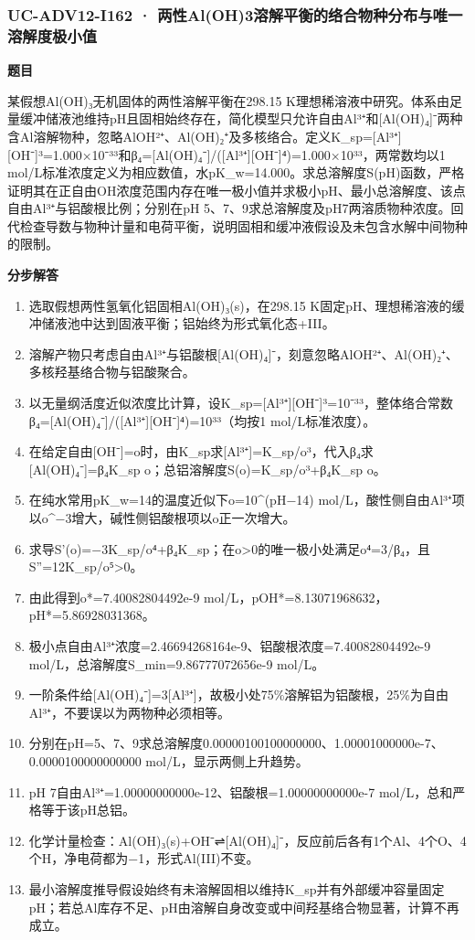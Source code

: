 \documentclass[UTF8,11pt,a4paper]{ctexart}
\begin{document}
\subsubsection*{UC-ADV12-I162 · 两性Al(OH)3溶解平衡的络合物种分布与唯一溶解度极小值}
\noindent\textbf{题目}\par
某假想Al(OH)₃无机固体的两性溶解平衡在298.15 K理想稀溶液中研究。体系由足量缓冲储液池维持pH且固相始终存在，简化模型只允许自由Al³⁺和[Al(OH)₄]⁻两种含Al溶解物种，忽略AlOH²⁺、Al(OH)₂⁺及多核络合。定义K\_sp=[Al³⁺][OH⁻]³=1.000×10⁻³³和β₄=[Al(OH)₄⁻]/([Al³⁺][OH⁻]⁴)=1.000×10³³，两常数均以1 mol/L标准浓度定义为相应数值，水pK\_w=14.000。求总溶解度S(pH)函数，严格证明其在正自由OH浓度范围内存在唯一极小值并求极小pH、最小总溶解度、该点自由Al³⁺与铝酸根比例；分别在pH 5、7、9求总溶解度及pH7两溶质物种浓度。回代检查导数与物种计量和电荷平衡，说明固相和缓冲液假设及未包含水解中间物种的限制。\par
\medskip\noindent\textbf{分步解答}
\begin{enumerate}
\item 选取假想两性氢氧化铝固相Al(OH)₃(s)，在298.15 K固定pH、理想稀溶液的缓冲储液池中达到固液平衡；铝始终为形式氧化态+III。
\item 溶解产物只考虑自由Al³⁺与铝酸根[Al(OH)₄]⁻，刻意忽略AlOH²⁺、Al(OH)₂⁺、多核羟基络合物与铝酸聚合。
\item 以无量纲活度近似浓度比计算，设K\_sp=[Al³⁺][OH⁻]³=10⁻³³，整体络合常数β₄=[Al(OH)₄⁻]/([Al³⁺][OH⁻]⁴)=10³³（均按1 mol/L标准浓度）。
\item 在给定自由[OH⁻]=o时，由K\_sp求[Al³⁺]=K\_sp/o³，代入β₄求[Al(OH)₄⁻]=β₄K\_sp o；总铝溶解度S(o)=K\_sp/o³+β₄K\_sp o。
\item 在纯水常用pK\_w=14的温度近似下o=10\textasciicircum{}(pH−14) mol/L，酸性侧自由Al³⁺项以o\textasciicircum{}−3增大，碱性侧铝酸根项以o正一次增大。
\item 求导S'(o)=−3K\_sp/o⁴+β₄K\_sp；在o>0的唯一极小处满足o⁴=3/β₄，且S''=12K\_sp/o⁵>0。
\item 由此得到o*=7.40082804492e-9 mol/L，pOH*=8.13071968632，pH*=5.86928031368。
\item 极小点自由Al³⁺浓度=2.46694268164e-9、铝酸根浓度=7.40082804492e-9 mol/L，总溶解度S\_min=9.86777072656e-9 mol/L。
\item 一阶条件给[Al(OH)₄⁻]=3[Al³⁺]，故极小处75\%溶解铝为铝酸根，25\%为自由Al³⁺，不要误以为两物种必须相等。
\item 分别在pH=5、7、9求总溶解度0.00000100100000000、1.00001000000e-7、0.0000100000000000 mol/L，显示两侧上升趋势。
\item pH 7自由Al³⁺=1.00000000000e-12、铝酸根=1.00000000000e-7 mol/L，总和严格等于该pH总铝。
\item 化学计量检查：Al(OH)₃(s)+OH⁻⇌[Al(OH)₄]⁻，反应前后各有1个Al、4个O、4个H，净电荷都为−1，形式Al(III)不变。
\item 最小溶解度推导假设始终有未溶解固相以维持K\_sp并有外部缓冲容量固定pH；若总Al库存不足、pH由溶解自身改变或中间羟基络合物显著，计算不再成立。
\end{enumerate}
\end{document}
